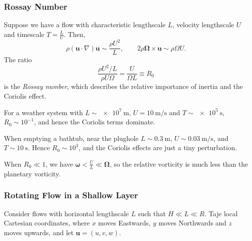 \documentclass[12pt]{article}
\begin{document}
\subsubsection{Rossay Number}
\label{subsub:rossay_number}

Suppose we have a flow with characteristic lengthscale $L$, velocity lengthscale $U$ and timescale $T = \frac{L}{U}$. Then,
\[
\rho (\mathbf{u} \cdot \nabla)\mathbf{u} \sim \frac{\rho U^2}{L}, \qquad 2 \rho \bm{\Omega} \times \mathbf{u} \sim \rho \Omega U.
\]
The ratio
\[
\frac{\rho U^2/L}{\rho U \Omega} = \frac{U}{\Omega L} \equiv R_0
\]
is the \emph{Rossay number}, which describes the relative importance of inertia and the Coriolis effect.

\begin{exbox}
	For a weather system with $L \sim \qty{e7}{\metre}$, $U = \qty{10}{\metre \per \second}$ and $T \sim \qty{e5}{\second}$, $R_0 \sim 10^{-1}$, and hence the Coriolis terms dominate.

When emptying a bathtub, near the plughole $L \sim \qty{0.3}{\metre}$, $U \sim \qty{0.03}{\meter \per \second}$, and $T \sim \qty{10}{\second}$. Hence $R_0 \sim 10^{3}$, and the Coriolis effects are just a tiny perturbation.
\end{exbox}

When $R_0 \ll 1$, we have $\bm{\omega} < \frac{U}{L} \ll \bm{\Omega}$, so the relative vorticity is much less than the planetary vorticity.

\subsubsection{Rotating Flow in a Shallow Layer}
\label{subsub:rotating_flow_in_a_shallow_layer}

Consider flows with horizontal lengthscale $L$ such that $H \ll L \ll R$. Taje local Cartesian coordinates, where $x$ moves Eastwards, $y$ moves Northwards and $z$ moves upwards, and let $\mathbf{u} = (u, v, w)$.
\end{document}
